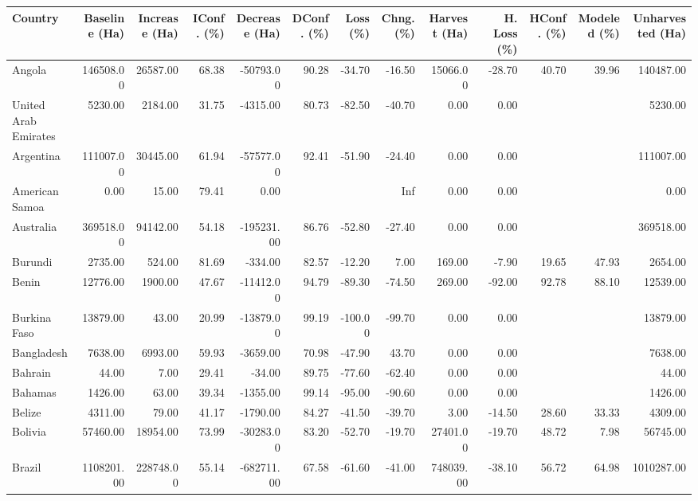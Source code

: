 \begin{table}[ht]
\centering
\begin{tabular}{lrrrrrrrrrrrr}
  \hline
Country & Baseline (Ha) & Increase (Ha) & IConf. (\%) & Decrease (Ha) & DConf. (\%) & Loss (\%) & Chng. (\%) & Harvest (Ha) & H. Loss (\%) & HConf. (\%) & Modeled (\%) & Unharvested (Ha) \\ 
  \hline
Angola & 146508.00 & 26587.00 & 68.38 & -50793.00 & 90.28 & -34.70 & -16.50 & 15066.00 & -28.70 & 40.70 & 39.96 & 140487.00 \\ 
  United Arab Emirates & 5230.00 & 2184.00 & 31.75 & -4315.00 & 80.73 & -82.50 & -40.70 & 0.00 & 0.00 &  &  & 5230.00 \\ 
  Argentina & 111007.00 & 30445.00 & 61.94 & -57577.00 & 92.41 & -51.90 & -24.40 & 0.00 & 0.00 &  &  & 111007.00 \\ 
  American Samoa & 0.00 & 15.00 & 79.41 & 0.00 &  &  & Inf & 0.00 & 0.00 &  &  & 0.00 \\ 
  Australia & 369518.00 & 94142.00 & 54.18 & -195231.00 & 86.76 & -52.80 & -27.40 & 0.00 & 0.00 &  &  & 369518.00 \\ 
  Burundi & 2735.00 & 524.00 & 81.69 & -334.00 & 82.57 & -12.20 & 7.00 & 169.00 & -7.90 & 19.65 & 47.93 & 2654.00 \\ 
  Benin & 12776.00 & 1900.00 & 47.67 & -11412.00 & 94.79 & -89.30 & -74.50 & 269.00 & -92.00 & 92.78 & 88.10 & 12539.00 \\ 
  Burkina Faso & 13879.00 & 43.00 & 20.99 & -13879.00 & 99.19 & -100.00 & -99.70 & 0.00 & 0.00 &  &  & 13879.00 \\ 
  Bangladesh & 7638.00 & 6993.00 & 59.93 & -3659.00 & 70.98 & -47.90 & 43.70 & 0.00 & 0.00 &  &  & 7638.00 \\ 
  Bahrain & 44.00 & 7.00 & 29.41 & -34.00 & 89.75 & -77.60 & -62.40 & 0.00 & 0.00 &  &  & 44.00 \\ 
  Bahamas & 1426.00 & 63.00 & 39.34 & -1355.00 & 99.14 & -95.00 & -90.60 & 0.00 & 0.00 &  &  & 1426.00 \\ 
  Belize & 4311.00 & 79.00 & 41.17 & -1790.00 & 84.27 & -41.50 & -39.70 & 3.00 & -14.50 & 28.60 & 33.33 & 4309.00 \\ 
  Bolivia & 57460.00 & 18954.00 & 73.99 & -30283.00 & 83.20 & -52.70 & -19.70 & 27401.00 & -19.70 & 48.72 & 7.98 & 56745.00 \\ 
  Brazil & 1108201.00 & 228748.00 & 55.14 & -682711.00 & 67.58 & -61.60 & -41.00 & 748039.00 & -38.10 & 56.72 & 64.98 & 1010287.00 \\ 

\end{tabular}
\end{table}
